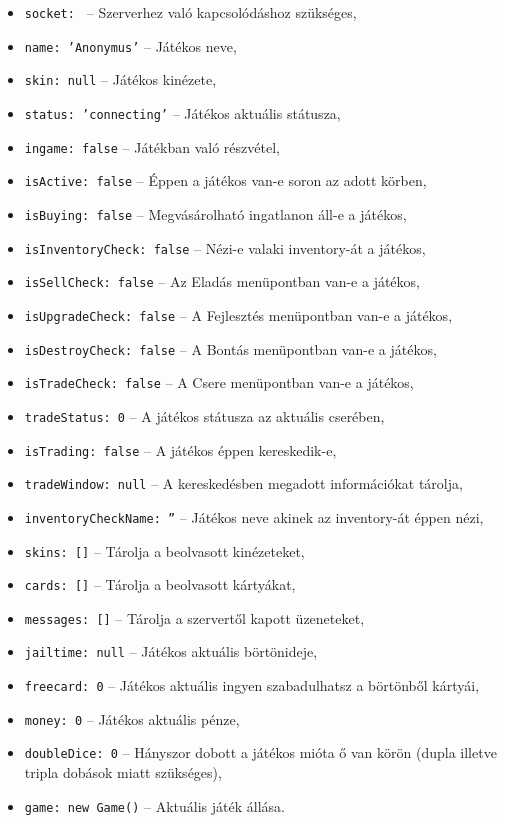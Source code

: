 \begin{itemize}
	\item \texttt{socket: {}} -- Szerverhez való kapcsolódáshoz szükséges,
	\item \texttt{name: 'Anonymus'} -- Játékos neve,
	\item \texttt{skin: null} -- Játékos kinézete,
	\item \texttt{status: 'connecting'} -- Játékos aktuális státusza,
	\item \texttt{ingame: false} -- Játékban való részvétel,
	\item \texttt{isActive: false} -- Éppen a játékos van-e soron az adott körben,
	\item \texttt{isBuying: false} -- Megvásárolható ingatlanon áll-e a játékos,
	\item \texttt{isInventoryCheck: false} -- Nézi-e valaki inventory-át a játékos,
	\item \texttt{isSellCheck: false} -- Az Eladás menüpontban van-e a játékos,
	\item \texttt{isUpgradeCheck: false} -- A Fejlesztés menüpontban van-e a játékos,
	\item \texttt{isDestroyCheck: false} -- A Bontás menüpontban van-e a játékos,
	\item \texttt{isTradeCheck: false} -- A Csere menüpontban van-e a játékos,
	\item \texttt{tradeStatus: 0} -- A játékos státusza az aktuális cserében,
	\item \texttt{isTrading: false} -- A játékos éppen kereskedik-e,
	\item \texttt{tradeWindow: null} -- A kereskedésben megadott információkat tárolja,
	\item \texttt{inventoryCheckName: ''} -- Játékos neve akinek az inventory-át éppen nézi,
	\item \texttt{skins: []} -- Tárolja a beolvasott kinézeteket,
	\item \texttt{cards: []} -- Tárolja a beolvasott kártyákat,
	\item \texttt{messages: []} -- Tárolja a szervertől kapott üzeneteket,
	\item \texttt{jailtime: null} -- Játékos aktuális börtönideje,
	\item \texttt{freecard: 0} -- Játékos aktuális ingyen szabadulhatsz a börtönből kártyái,
	\item \texttt{money: 0} -- Játékos aktuális pénze,
	\item \texttt{doubleDice: 0} -- Hányszor dobott a játékos mióta ő van körön (dupla illetve tripla dobások miatt szükséges),
	\item \texttt{game: new Game()} -- Aktuális játék állása.
\end{itemize}

